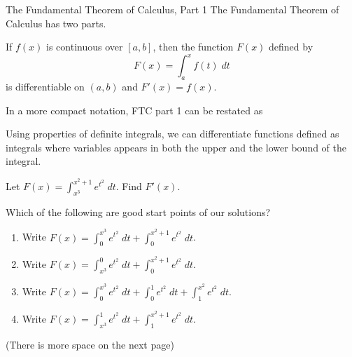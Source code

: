 \documentclass[../main.tex]{subfiles}
\begin{document}
\begin{lesson}{The Fundamental Theorem of Calculus, Part 1}
  The Fundamental Theorem of Calculus has two parts.

  \begin{mdframed}[style=withref-compact]
    If \(f(x)\) is continuous over \([a,b]\), then the function \(F(x)\) defined by
    \[
      F(x) = \int_{a}^{x} f(t) \;dt
    \]
    is differentiable on \((a,b)\) and \(F'(x) = f(x)\).

  \end{mdframed}

  In a more compact notation, FTC part 1 can be restated as 

  Using properties of definite integrals, we can differentiate functions defined as integrals where variables appears in both the upper and the lower bound of the integral.
  \begin{example} \label{ex:ftc-one}
    Let \(F(x) = \int_{x^{3}}^{x^{2} + 1} e^{t^{2}} \;dt\). Find \(F'(x)\).

    Which of the following are good start points of our solutions?
    \begin{enumerate}[label=(\alph*)]
      \item Write \(F(x) = \int_{0}^{x^{3}} e^{t^{2}} \;dt + \int_{0}^{x^{2}+1} e^{t^{2}} \;dt \).
      \item Write \(F(x) = \int_{x^{3}}^{0} e^{t^{2}} \;dt + \int_{0}^{x^{2}+1} e^{t^{2}} \;dt \).
      \item Write \(F(x) = \int_{0}^{x^{3}} e^{t^{2}} \;dt + \int_{0}^{1} e^{t^{2}} \;dt + \int_{1}^{x^{2}} e^{t^{2}} \;dt\).
      \item Write \(F(x) = \int_{x^{3}}^{1} e^{t^{2}} \;dt + \int_{1}^{x^{2}+1} e^{t^{2}} \;dt \).
    \end{enumerate}

    {\footnotesize (There is more space on the next page)}
  \end{example}
\end{lesson}
\end{document}
